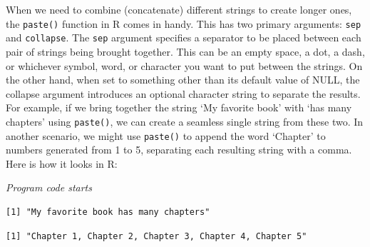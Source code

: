 When we need to combine (concatenate) different strings to create longer ones, the
\texttt{paste()} function in R comes in handy. This has two
primary arguments: \texttt{sep} and \texttt{collapse}. The \texttt{sep}
argument specifies a separator to be placed between each pair of strings
being brought together. This can be an empty space, a dot, a dash,
or whichever symbol, word, or character you want to put between the
strings. On the other hand, when set to something other than its default
value of NULL, the collapse argument introduces an optional character
string to separate the results. For example, if we
bring together the string `My favorite book' with `has many chapters' using
\texttt{paste()}, we can create a seamless single string from these two.
In another scenario, we might use \texttt{paste()} to append the word
`Chapter' to numbers generated from 1 to 5, separating each resulting
string with a comma. Here is how it looks in R:

\emph{Program code starts}

\begin{Shaded}
\begin{Highlighting}[]
\OtherTok{\textless{}{-}}\NormalTok{(}\NormalTok{, }\NormalTok{, } \NormalTok{)}
\end{Highlighting}
\end{Shaded}

\begin{verbatim}
[1] "My favorite book has many chapters"
\end{verbatim}

\begin{Shaded}
\begin{Highlighting}[]
\OtherTok{\textless{}{-}} \NormalTok{(}\NormalTok{, }\SpecialCharTok{:}\NormalTok{, } \NormalTok{, } \NormalTok{)}
\end{Highlighting}
\end{Shaded}

\begin{verbatim}
[1] "Chapter 1, Chapter 2, Chapter 3, Chapter 4, Chapter 5"
\end{verbatim}

